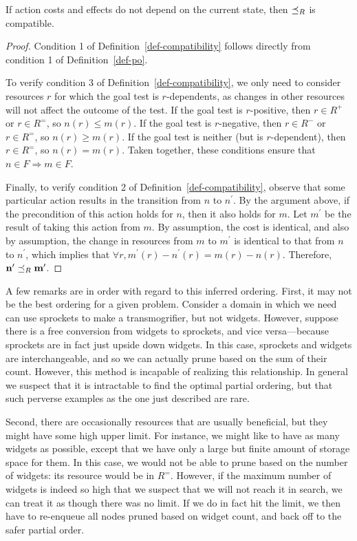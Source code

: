 \documentclass[letterpaper]{article}
\theoremstyle{plain} \newtheorem{theorem}{Theorem} \newtheorem{proposition}{Proposition} \newtheorem{lemma}{Lemma}
\theoremstyle{definition} \newtheorem{definition}{Definition} \newtheorem{conjecture}{Conjecture} \newtheorem*{example}{Example}
\theoremstyle{remark} \newtheorem*{remark}{Remark} \newtheorem*{note}{Note} \newtheorem{case}{Case}
\begin{document}
\begin{claim}{}{\label{clm-po-compatible}}
	If action costs and effects do not depend on the current state, then $\preceq_R$ is compatible.
\end{claim}
\begin{proof}
	Condition 1 of Definition~\ref{def-compatibility} follows directly from condition 1 of Definition~\ref{def-po}.
	
	To verify condition 3 of Definition~\ref{def-compatibility},
  we only need to consider resources $r$ for which the goal
  test is $r$-dependents, as changes in other resources will not affect the outcome of the test. If the goal test is $r$-positive, then $r \in R^+$ or $r \in R^=$, so $n(r) \le m(r)$. If the goal test is $r$-negative, then $r \in R^-$ or $r \in R^=$, so $n(r) \ge m(r)$. If the goal test is neither (but is $r$-dependent), then $r \in R^=$, so $n(r) = m(r)$. Taken together, these conditions ensure that $n \in F \Rightarrow m \in F$.
	
	Finally, to verify condition 2 of Definition~\ref{def-compatibility}, observe that some particular action results in the transition from $n$ to $n^\prime$. By the argument above, if the precondition of this action holds for $n$, then it also holds for $m$. Let
  $m^\prime$ be the result of taking this action from $m$. By assumption, the cost is identical, and also by assumption, the change in resources from $m$ to $m^\prime$ is identical to that from $n$ to $n^\prime$, which implies that $\forall r, m^\prime(r) -
  n^\prime(r) = m(r) - n(r)$. Therefore, $\mathbf{n^\prime} \preceq_R \mathbf{m^\prime}$.
\end{proof}

A few remarks are in order with regard to this inferred ordering.
First, it may not be the best ordering for a given problem. Consider a domain in
which we need can use sprockets to make a transmogrifier, but
not widgets. However, suppose there is a free conversion from widgets
to sprockets, and vice versa---because sprockets are in fact just
upside down widgets. In this case, sprockets and widgets are
interchangeable, and so we can actually prune based on the sum of
their count. However, this method is incapable of realizing this
relationship. In general we suspect that it is
intractable to find the
optimal partial ordering, but that such perverse examples
as the one just described are rare.

Second, there are occasionally resources that are usually beneficial,
but they might have some high upper limit. For instance, we might
like to have as many widgets as possible, except that we have only
a large but finite amount of storage space for them.  In this case,
we would not be able to prune based on the number of widgets: its
resource would be in $R^=$. However, if the maximum number of widgets
is indeed so high that we suspect that we will not reach it in
search, we can treat it as though there was no limit. If we do in
fact hit the limit, we then have to re-enqueue all nodes pruned
based on widget count, and back off to the safer partial order.
\end{document}
